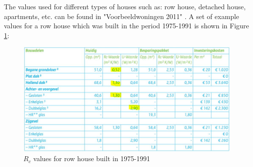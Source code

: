 The values used for different types of houses such as: row house, detached house, apartments, etc. can be found in "Voorbeeldwoningen 2011" \cite{VOORBEELD}. A set of example values for a row house which was built in the period 1975-1991 is shown in Figure \ref{fig:rowhouse}:


	
\begin{figure}[H]
	\centering
	\includegraphics[width=0.8\columnwidth]{Pictures/row_house_1975-1991.JPG}
	\caption[Short title]{$R_c$ values for row house built in 1975-1991 \cite{VOORBEELD}}
	\label{fig:rowhouse}
	\end{figure} 
\newpage	